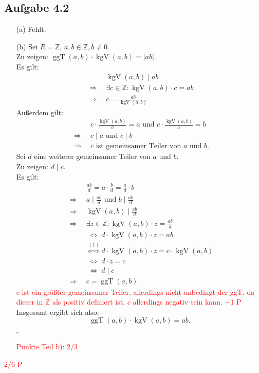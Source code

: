 \documentclass[12pt]{article}
\newcommand{\corr}[1]{\textcolor{red}{#1}}
\newcommand{\QED}{\begin{flushright} $\square$ \end{flushright}}
\newcommand{\df}{\enspace\Longrightarrow\enspace}
\newcommand{\gdw}{\;\Longleftrightarrow\;}
\newcommand{\abs}[1]{\vert #1\vert}
\newcommand{\ggT}{\operatorname{ggT}}
\newcommand{\kgV}{\operatorname{kgV}}
\begin{document}
\subsection*{Aufgabe 4.2}
\begin{enumerate}
	\item[(a)] Fehlt.
	
	\item[(b)] Sei $R=\mathbb{Z}$, $a,b\in\mathbb{Z},b\neq 0$. \\
	Zu zeigen: $\ggT(a,b)\cdot\kgV(a,b)=\abs{ab}$. \\
	Es gilt:
	\begin{align}
		&\kgV(a,b)\mid ab \nonumber\\
		\df &\exists c\in\mathbb{Z}:\kgV(a,b)\cdot c=ab \nonumber \\
		\df &c=\frac{ab}{\kgV(a,b)}
	\end{align}
	Außerdem gilt:
	\begin{align*}
		&c\cdot \frac{\kgV(a,b)}{b}=a\text{ und }c\cdot \frac{\kgV(a,b)}{a}=b \\
		\df &c\mid a\text{ und }c\mid b \\
		\df &c\text{ ist gemeinsamer Teiler von $a$ und $b$}.
	\end{align*}
	Sei $d$ eine weiterer gemeinsamer Teiler von $a$ und $b$. \\
	Zu zeigen: $d\mid c$. \\
	Es gilt:
	\begin{align*}
		&\frac{ab}{d}=a\cdot\frac{b}{d}=\frac{a}{d}\cdot b \\
		\df &a\mid\frac{ab}{d}\text{ und }b\mid\frac{ab}{d} \\
		\df &\kgV(a,b)\mid\frac{ab}{d} \\
		\df &\exists z\in\mathbb{Z}:\kgV(a,b)\cdot z=\frac{ab}{d} \\
		&\gdw d\cdot\kgV(a,b)\cdot z=ab \\
		&\overset{(1)}{\gdw} d\cdot\kgV(a,b)\cdot z=c\cdot\kgV(a,b) \\
		&\gdw d\cdot z=c \\
		&\gdw d\mid c \\
		\df &c=\ggT(a,b).
	\end{align*}
\corr{$c$ ist ein größter gemeinsamer Teiler, allerdings nicht unbedingt der ggT, da dieser in $\mathbb{Z}$ als positiv definiert ist, $c$ allerdings negativ sein kann. $-1$ P}\\
	Insgesamt ergibt sich also: $$\ggT(a,b)\cdot\kgV(a,b)=ab.$$
	\QED
\corr{Punkte Teil b): $2/3$}
\end{enumerate}
\corr{$2/6$ P}
\end{document}
